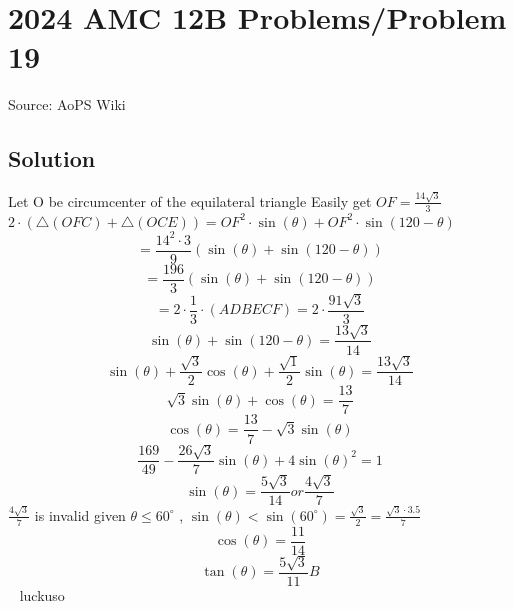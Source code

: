 \documentclass[12pt]{article}
\begin{document}
\section*{{2024 AMC 12B Problems/Problem 19}}
Source: AoPS Wiki

\subsection*{Solution}
Let O be circumcenter of the equilateral triangle Easily get $OF = \frac{14\sqrt{3}}{3}$ $2 \cdot (\triangle(OFC) + \triangle(OCE)) = OF^2 \cdot \sin(\theta) + OF^2 \cdot \sin(120 - \theta)$ \[= \frac{14^2 \cdot 3}{9} ( \sin(\theta) + \sin(120 - \theta) )\] \[= \frac{196}{3} ( \sin(\theta) + \sin(120 - \theta) )\] \[= 2 \cdot {\frac{1}{3} } \cdot(ADBECF) = 2\cdot \frac{91\sqrt{3}}{3}\] \[\sin(\theta) + \sin(120 - \theta) = \frac{13\sqrt{3}}{14}\] \[\sin(\theta) + \frac{ \sqrt{3}}{2}\cos( \theta) +\frac{ \sqrt{1}}{2}\sin( \theta) = \frac{13\sqrt{3}}{14}\] \[\sqrt{3} \sin( \theta) + \cos( \theta) = \frac{13 }{7}\] \[\cos( \theta) = \frac{13 }{7} - \sqrt{3} \sin( \theta)\] \[\frac{169 }{49} - \frac{26\sqrt{3} }{7} \sin( \theta) + 4 \sin( \theta)^2 = 1\] \[\sin( \theta) = \frac{5\sqrt{3} }{14} or \frac{4\sqrt{3} }{7}\] $\frac{4\sqrt{3} }{7}$ is invalid given $\theta \leq 60^\circ$ , $\sin(\theta ) < \sin( 60^\circ ) = \frac{\sqrt{3} }{2} = \frac{\sqrt{3} \cdot 3.5}{7}$ \[\cos( \theta) = \frac{11 }{14}\] \[\tan( \theta) = \frac{5\sqrt{3} }{11} \boxed{B }\] ~ luckuso
\end{document}
